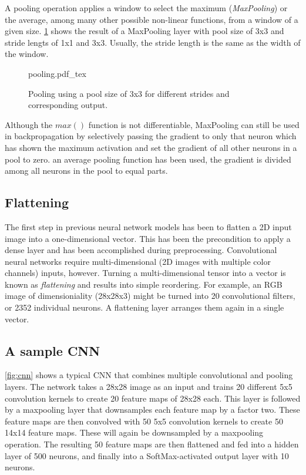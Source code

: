 A pooling operation applies a window to select the maximum (\textsl{MaxPooling}) or the average, among many other possible non-linear functions, from a window of a given size. \cref{fig:pooling} shows the result of a MaxPooling layer with pool size of 3x3 and stride lengts of 1x1 and 3x3. Usually, the stride length is the same as the width of the window.

\begin{figure}[htb]
    \centering
    \def\svgwidth{0.8\textwidth}
    {pooling.pdf_tex}
    \caption{Pooling using a pool size of 3x3 for different strides and corresponding output.\label{fig:pooling}}
\end{figure}

Although the $max()$ function is not differentiable, MaxPooling can still be used in backpropagation by selectively passing the gradient to only that neuron which has shown  the maximum activation and set the gradient of all other neurons in a pool to zero.  an average pooling function has been used, the gradient is divided among all neurons in the pool to equal parts.

\subsection{Flattening}

The first step in previous neural network models has been to flatten a 2D input image into a one-dimensional vector. This has been the precondition to apply a dense layer and has been accomplished during preprocessing. Convolutional neural networks require multi-dimensional (2D images with multiple color channels) inputs, however. Turning a multi-dimensional tensor into a vector is known as \textsl{flattening} and results into simple reordering. For example, an RGB image of dimensioniality (28x28x3) might be turned into 20 convolutional filters, or 2352 individual neurons. A flattening layer arranges them again in a single vector.

\subsection{A sample CNN}

\cref{fig:cnn} shows a typical CNN that combines multiple convolutional and pooling layers. The network takes a 28x28 image as an input and trains 20 different 5x5 convolution kernels to create 20 feature maps of 28x28 each. This layer is followed by a maxpooling layer that downsamples each feature map by a factor two. These feature maps are then convolved with 50 5x5 convolution kernels to create 50 14x14 feature maps. These will again be downsampled by a maxpooling operation. The resulting 50 feature maps are then flattened and fed into a hidden layer of 500 neurons, and finally into a SoftMax-activated output layer with 10 neurons.

